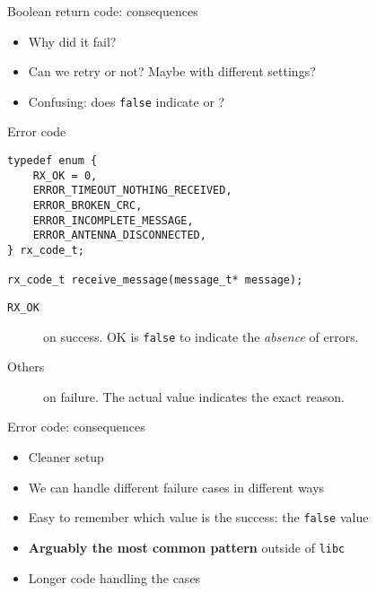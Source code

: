 \documentclass[aspectratio=169,14pt]{beamer}
\begin{document}
\begin{frame}[fragile]{Boolean return code: consequences}
\begin{itemize}
    \item[\bad] Why did it fail?
    \item[\bad] Can we retry or not? Maybe with different settings?
    \item[\bad] Confusing: does \texttt{false} indicate  or ?
\end{itemize}
\end{frame}



\begin{frame}[fragile]{Error code}
\begin{lstlisting}[style=cstyle]
typedef enum {
    RX_OK = 0,
    ERROR_TIMEOUT_NOTHING_RECEIVED,
    ERROR_BROKEN_CRC,
    ERROR_INCOMPLETE_MESSAGE,
    ERROR_ANTENNA_DISCONNECTED,
} rx_code_t;

rx_code_t receive_message(message_t* message);
\end{lstlisting}

\begin{description}
    \item[\texttt{RX\_OK}] on success. OK is \texttt{false} to indicate the \textit{absence} of errors.
    \item[Others] on failure. The actual value indicates the exact reason.
\end{description}
\end{frame}



\begin{frame}[fragile]{Error code: consequences}
\begin{itemize}
    \item[\good] Cleaner setup
    \item[\good] We can handle different failure cases in different ways
    \item[\good] Easy to remember which value is the success: the \texttt{false} value
    \item[\good] \textbf{Arguably the most common pattern} outside of \texttt{libc}
    \item[\bad] Longer code handling the cases
\end{itemize}
\end{frame}
\end{document}
